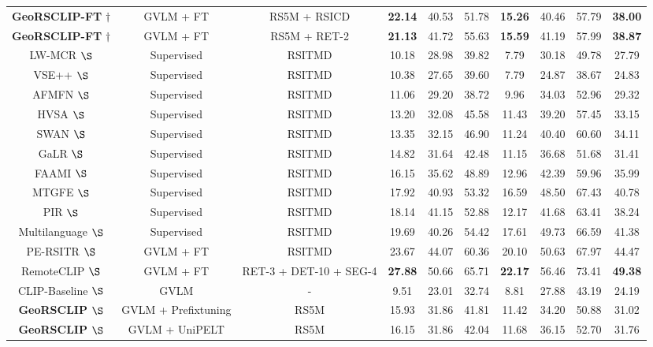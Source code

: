 \documentclass[journal]{IEEEtran}
\begin{document}
\begin{table*}
\begin{tabular}{cccccccccc}
\textbf{GeoRSCLIP-FT} $ \dagger $ & GVLM + FT & RS5M + RSICD &\textbf{22.14} & 40.53 & 51.78&\textbf{15.26}&40.46& 57.79 & \textbf{38.00} \\
\textbf{GeoRSCLIP-FT} $ \dagger $ & GVLM + FT & RS5M + RET-2 & \textbf{21.13}& 41.72& 55.63&\textbf{15.59} & 41.19 &57.99 & \textbf{38.87} \\
\midrule
LW-MCR \cite{LW-MCR} $ \S $ & Supervised & RSITMD&10.18  & 28.98  & 39.82  & 7.79  & 30.18  & 49.78  & 27.79 \\ 
VSE++ \cite{vse++} $ \S $& Supervised & RSITMD & 10.38  & 27.65  & 39.60  & 7.79  & 24.87  & 38.67  & 24.83  \\
AFMFN \cite{RSITMD} $ \S $& Supervised & RSITMD & 11.06  & 29.20  & 38.72  & 9.96  & 34.03  & 52.96  & 29.32  \\
HVSA \cite{hvsa} $ \S $ & Supervised & RSITMD&13.20  &32.08  &45.58  &11.43  &39.20  &57.45  & 33.15  \\ 
SWAN $\S $ & Supervised & RSITMD & 13.35  & 32.15  & 46.90  & 11.24  & 40.40  & 60.60  & 34.11  \\
GaLR \cite{galr} $ \S $& Supervised & RSITMD & 14.82  & 31.64  & 42.48  & 11.15  & 36.68  & 51.68  & 31.41  \\
FAAMI \cite{Zheng_2023} $ \S $ & Supervised & RSITMD & 16.15  & 35.62  & 48.89  & 12.96   & 42.39  & 59.96  & 35.99  \\ 
MTGFE \cite{MTGFE} $ \S $ &Supervised& RSITMD & 17.92 & 40.93 & 53.32& 16.59&48.50 & 67.43 & 40.78\\
PIR \cite{pir} $ \S $ & Supervised & RSITMD & 18.14  & 41.15  &52.88  & 12.17  & 41.68  & 63.41   & 38.24 \\ 
Multilanguage \cite{multilingual} $ \S $ &Supervised& RSITMD & 19.69& 40.26& 54.42& 17.61& 49.73&66.59 & 41.38\\
PE-RSITR \cite{yuan2023parameterefficient} $ \S $ & GVLM + FT & RSITMD & 23.67 & 44.07 & 60.36& 20.10&50.63 &67.97 & 44.47\\
RemoteCLIP \cite{liu2023remoteclip} $ \S $ & GVLM + FT & RET-3 + DET-10 + SEG-4 & \textbf{27.88} & 50.66 & 65.71 & \textbf{22.17} & 56.46 & 73.41 & \textbf{49.38}\\
CLIP-Baseline \cite{clip} $ \S $ & GVLM & - & 9.51 	& 23.01 &  	32.74 	& 8.81 	& 27.88  & 	43.19  & 	24.19  \\
\textbf{GeoRSCLIP} $ \S $ &GVLM + Prefix\-tuning & RS5M & 15.93  &31.86  &41.81 & 11.42  & 34.20  &50.88  &31.02 \\
\textbf{GeoRSCLIP} $ \S $ &GVLM + UniPELT& RS5M & 16.15  & 31.86   & 42.04  & 11.68  &  36.15  & 52.70   &31.76  \\

\end{tabular}
\end{table*}
\end{document}
